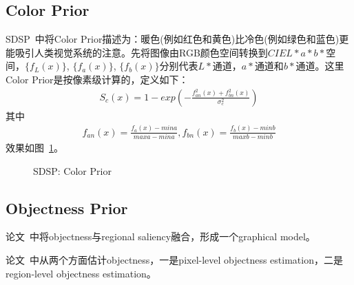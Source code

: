 \documentclass[12pt]{article}
\begin{document}
\subsection{Color Prior}

SDSP~\cite{zhang2013sdsp}中将Color Prior描述为：暖色(例如红色和黄色)比冷色(例如绿色和蓝色)更能吸引人类视觉系统的注意。先将图像由RGB颜色空间转换到$CIEL*a*b*$空间，$\{ f_L(x)\}$, $\{ f_a(x)\}$, $\{ f_b(x)\}$分别代表$L*$通道，$a*$通道和$b*$通道。这里Color Prior是按像素级计算的，定义如下：
\begin{align}
S_c(x) = 1-exp\left(-\frac{f_{an}^2(x)+f_{bn}^2(x)}{\sigma_c^2}\right)
\end{align}
其中
\begin{align}
f_{an}(x)=\frac{f_a(x)-mina}{maxa-mina}, f_{bn}(x) = \frac{f_b(x)-minb}{maxb-minb}
\end{align}
效果如图~\ref{fig: SDSPColorPrior}。
\begin{figure}
  \centering 
  \caption{SDSP: Color Prior}
  \label{fig: SDSPColorPrior} %
\end{figure}

\subsection{Objectness Prior}

论文~\cite{chang2011fusing}中将objectness与regional saliency融合，形成一个graphical model。

论文~\cite{jiangpeng2013salient}中从两个方面估计objectness，一是pixel-level objectness estimation，二是region-level objectness estimation。
\end{document}
